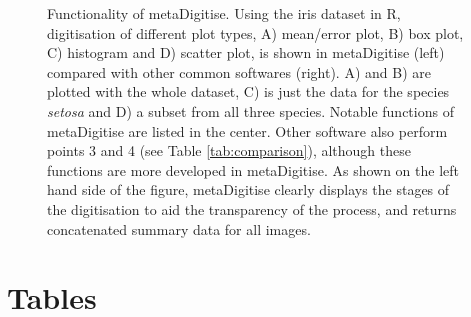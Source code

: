 \documentclass[12pt]{article}
\newcommand{\pkg}[1]{{\fontseries{b}\selectfont #1}}
\begin{document}
\begin{figure}[!h]
\centering 
{}
 \caption{%
Functionality of \pkg{metaDigitise}. Using the iris dataset in R, digitisation of different plot types, A) mean/error plot, B) box plot, C) histogram and D) scatter plot, is shown in \pkg{metaDigitise} (left) compared with other common softwares (right). A) and B) are plotted with the whole dataset, C) is just the data for the species \textit{setosa} and D) a subset from all three species. Notable functions of metaDigitise are listed in the center. Other software also perform points 3 and 4 (see Table \ref{tab:comparison}), although these functions are more developed in \pkg{metaDigitise}. As shown on the left hand side of the figure, \pkg{metaDigitise} clearly displays the stages of the digitisation to aid the transparency of the process, and returns concatenated summary data for all images.
}
\label{fig:all_extract}
\end{figure}

\clearpage

\section*{Tables}
\end{document}
